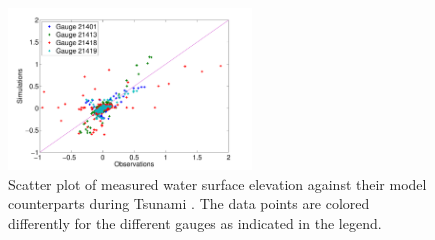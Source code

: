 %
\begin{figure}[ht]
\centering
\includegraphics[width=0.575\textwidth]{./figures/scatter.pdf} 
\caption{Scatter plot of measured water surface elevation against their \geoclaw
model counterparts during Tsunami \tohoku. The data points are colored 
differently for the different gauges as indicated in the legend. }
\label{fig:scatter}

\end{figure}  
